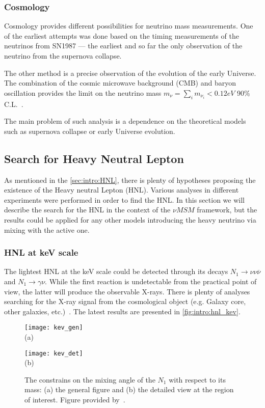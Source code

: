 \documentclass[../main.tex]{subfiles}
\begin{document}
\subsubsection{Cosmology}
Cosmology provides different possibilities for neutrino mass measurements. One of the earliest attempts was done based on the timing measurements of the neutrinos from SN1987 --- the earliest and so far the only observation of the neutrino from the supernova collapse.

The other method is a precise observation of the evolution of the early Universe. The combination of the cosmic microwave background (CMB) and baryon oscillation provides the limit on the neutrino mass $m_\nu=\sum_i m_{\nu_i}<0.12eV$ 90\% C.L.~\cite{Palanque-Delabrouille2015}.

The main problem of such analysis is a dependence on the theoretical models such as supernova collapse or early Universe evolution.

\subsection{Search for Heavy Neutral Lepton}
\label{sec:intro:HNL_exp}
As mentioned in the \autoref{sec:intro:HNL}, there is plenty of hypotheses proposing the existence of the Heavy neutral Lepton (HNL). Various analyses in different experiments were performed in order to find the HNL. In this section we will describe the search for the HNL in the context of the $\nu MSM$ framework, but the results could be applied for any other models introducing the heavy neutrino via mixing with the active one.

\subsubsection{HNL at keV scale}
The lightest HNL at the keV scale could be detected through its decays $N_1\to \nu\nu\overline{\nu}$ and $N_1\to\gamma\nu$. While the first reaction is undetectable from the practical point of view, the latter will produce the observable X-rays. There is plenty of analyses searching for the X-ray signal from the cosmological object (e.g. Galaxy core, other galaxies, etc.)~\cite{Ng2019, Perez2017}. The latest results are presented in \autoref{fig:intro:hnl_kev}.

\begin{figure}[!ht]
  \centering
  \begin{minipage}{0.49\linewidth}
    \centering
    \texttt{[image: kev\_gen]} \\ (a)
  \end{minipage}
  \begin{minipage}{0.49\linewidth}
    \centering
    \texttt{[image: kev\_det]} \\ (b)
  \end{minipage}
  \caption{The constrains on the mixing angle of the $N_1$ with respect to its mass: (a) the general figure and (b) the detailed view at the region of interest. Figure provided by~\cite{Perez2017}.}
  \label{fig:intro:hnl_kev}
\end{figure}
\end{document}

